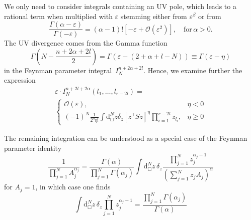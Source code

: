 \documentclass[11pt,a4paper]{refrep}
\begin{document}
We only need to consider integrals containing an UV pole, which leads to
a rational term when multiplied with $\varepsilon$ stemming either from
$\varepsilon^\beta$ or from
\begin{equation}
\frac{\Gamma(\alpha-\varepsilon)}{\Gamma(-\varepsilon)}=
(\alpha-1)!\left[-\varepsilon +{\mathcal O}(\varepsilon^2)\right],
\quad\text{for}\,\alpha>0.
\end{equation}
The UV divergence comes from the Gamma function
\begin{equation}
\Gamma\left(N-\frac{n+2\alpha+2l}2\right)=
\Gamma(\varepsilon-(2+\alpha+l-N))\equiv\Gamma(\varepsilon-\eta)
\end{equation}
in the Feynman parameter integral~$I_N^{n+2\alpha+2l}$.
Hence, we examine further the expression
\begin{multline}
\varepsilon\cdot I_N^{n+2l+2\alpha}(l_1,\ldots, l_{r-2l})=\\
\left\{\begin{array}{lr}
{\mathcal O}(\varepsilon),&\eta<0\\
(-1)^N\frac1{2^\eta\eta!}\int\mathrm{d}^N_\Box\!z\delta_z
\left[z^{\mathsf{T}}Sz\right]^\eta
\prod_{i=1}^{r-2l}z_{l_i},&\eta\geq0
\end{array}\right.
\end{multline}

The remaining integration can be understood as a special case of the
Feynman parameter identity
\begin{equation}
\frac{1}{\prod_{j=1}^N A_j^{\alpha_j}}=\frac{\Gamma(\alpha)}{
\prod_{j=1}^N \Gamma(\alpha_j)}\int\!\mathrm{d}^N_\Box\!z\,\delta_z
\frac{\prod_{j=1}^N z_j^{\alpha_j-1}}{\left(
\sum_{j=1}^N z_j A_j\right)^\alpha}
\end{equation}
for $A_j=1$, in which case one finds
\begin{equation}
\int\!\mathrm{d}^N_\Box\!z\,\delta_z
\prod_{j=1}^N z_j^{\alpha_j-1}=\frac{\prod_{j=1}^N \Gamma(\alpha_j)}%
{\Gamma(\alpha)}
\end{equation}
\end{document}
